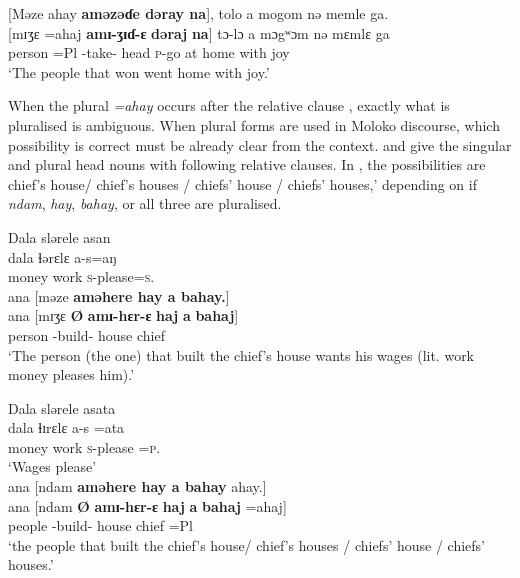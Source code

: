 \ea \label{ex:5:111}
{}[Məze  ahay  \textbf{aməzəɗe  dəray  na}],  tolo  a  mogom  nə  memle  ga.\\
\gll  {}[mɪʒɛ  =ahaj  \textbf{amɪ-ʒɪɗ{}-ɛ} \textbf{dəraj}  \textbf{na}]  tɔ-lɔ  a  mɔgʷɔm  nə  mɛmlɛ  ga\\
      person  =Pl  {\DEP}-take{}-{\CL}  head  {\PSP}  \textsc{p}-go  at  home  with  joy  {\ADJ}\\
\glt  ‘The people that won went home with joy.’
\z

When the plural \textit{=ahay}  occurs after the relative clause , exactly what is pluralised is ambiguous. When plural forms are used in Moloko discourse, which possibility is correct must be already clear from the context.  and  give the singular and plural head nouns with following relative clauses. In , the possibilities are chief’s house/ chief’s houses / chiefs’ house / chiefs’ houses,’ depending on if \textit{ndam}, \textit{hay}, \textit{bahay}, or all three are pluralised. 

\ea \label{ex:5:112}
Dala  slərele  asan  \\
\gll  dala       ɬərɛlɛ      a-s=aŋ     \\
      money  work        \textsc{s}-please=\textsc{s}.{\IO}   \\
      
      \medskip
ana  [məze  \textbf{aməhere  hay  a  bahay.}]\\
\gll   ana  [mɪʒɛ      \textbf{Ø}  \textbf{amɪ-hɛr-ɛ} \textbf{haj} \textbf{a}  \textbf{bahaj}]\\
{\DAT}   person   { } {\DEP}-build-{\CL}  house  {\GEN}      chief\\
\glt  ‘The person (the one) that built the chief’s house wants his wages (lit. work money pleases him).’
\z

\ea \label{ex:5:113}
Dala  slərele  asata \\ 
\gll  dala       ɬɪrɛlɛ    a-s  =ata\\
      money    work  \textsc{s}-please =\textsc{p}.{\IO}\\
\glt  ‘Wages please’\\
\medskip
ana  [ndam  \textbf{aməhere  hay  a  bahay} ahay.]\\
\gll ana [ndam \textbf{Ø} \textbf{amɪ-hɛr-ɛ} \textbf{haj} \textbf{a}  \textbf{bahaj} =ahaj] \\ 
{\DAT} people  { }  {\DEP}-build-{\CL}   house  {\GEN}  chief  =Pl \\
\glt ‘the people that built the chief’s house/ chief’s houses / chiefs’ house / chiefs’ houses.’ 
\z

